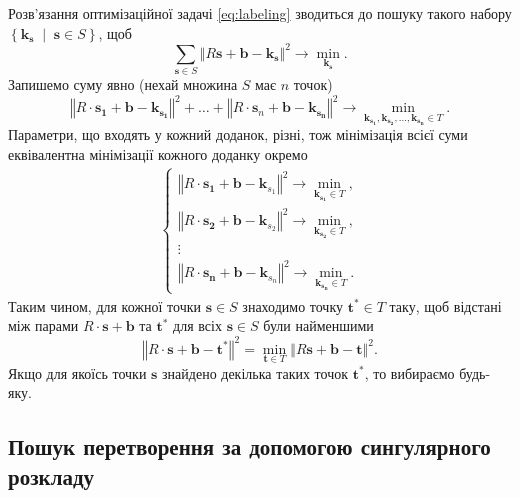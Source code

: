 Розв'язання оптимізаційної задачі \eqref{eq:labeling}
зводиться до пошуку такого набору
$ \left\{ \boldsymbol{k_s} \; \middle| \; \boldsymbol{s} \in S \right\} $, щоб
\begin{equation*}
  \sum \limits_{\boldsymbol{s} \in S}
    \left \Vert R \boldsymbol{s} + \boldsymbol{b} - \boldsymbol{k_s} \right \Vert^2 \to
  \min \limits_{\boldsymbol{k_s}}.
\end{equation*}
Запишемо суму явно (нехай множина $S$ має $n$ точок)
\begin{equation*}
  \left \Vert R \cdot \boldsymbol{s_1} + \boldsymbol{b} - \boldsymbol{k_{s_1}} \right \Vert^2 +
  \dotsc +
  \left \Vert
    R \cdot \boldsymbol{s}_n + \boldsymbol{b} - \boldsymbol{k_{s_n}}
  \right \Vert^2 \to
  \min \limits_{\boldsymbol{k_{s_1}}, \boldsymbol{k_{s_2}}, \dotsc, \boldsymbol{k_{s_n}} \in T}.
\end{equation*}
Параметри, що входять у кожний доданок, різні,
тож мінімізація всієї суми еквівалентна мінімізації кожного доданку окремо
\begin{align*}
  \left\{ \begin{array}{ccc}
    \left \Vert R \cdot \boldsymbol{s_1} + \boldsymbol{b} - \boldsymbol{k}_{s_1} \right \Vert^2
    \to \min \limits_{\boldsymbol{k_{s_1}} \in T}, \\
    \left \Vert R \cdot \boldsymbol{s_2} + \boldsymbol{b} - \boldsymbol{k}_{s_2} \right \Vert^2 \to
    \min \limits_{\boldsymbol{k_{s_2}} \in T}, \\
    \vdots \\
    \left \Vert
      R \cdot \boldsymbol{s_n} + \boldsymbol{b} - \boldsymbol{k}_{s_n}
    \right \Vert^2 \to
    \min \limits_{\boldsymbol{k_{s_n}} \in T}.
  \end{array} \right.
\end{align*}
Таким чином, для кожної точки $ \boldsymbol{s} \in S$ знаходимо точку
$ \boldsymbol{t}^* \in T$ таку,
щоб відстані між парами $R \cdot \boldsymbol{s} + \boldsymbol{b}$ та $ \boldsymbol{t}^*$ для всіх
$ \boldsymbol{s} \in S$ були найменшими
\begin{equation*}
  \left \Vert R \cdot \boldsymbol{s} + \boldsymbol{b} - \boldsymbol{t}^* \right \Vert^2 =
  \min \limits_{\boldsymbol{t} \in T}
    \left \Vert R \boldsymbol{s} + \boldsymbol{b} - \boldsymbol{t} \right \Vert^2.
\end{equation*}
Якщо для якоїсь точки $\boldsymbol{s}$ знайдено декілька таких точок $\boldsymbol{t}^*$,
то вибираємо будь-яку.

\subsection{Пошук перетворення за допомогою сингулярного розкладу}


